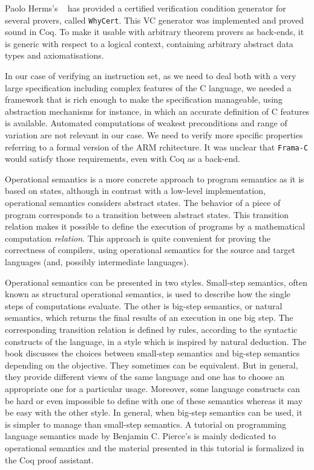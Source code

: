 \documentclass[twocolumn]{article}
\newcommand{\whyCert}{\texttt{WhyCert}\xspace}
\newcommand{\framac}{\texttt{Frama-C}\xspace}
\begin{document}
Paolo Herms's \cite{herms13phd}~\cite{herms2012certified} has provided
a certified verification condition generator for several provers,
called \whyCert.  This VC generator was implemented and proved sound
in Coq.  To make it usable with arbitrary theorem provers as
back-ends, it is generic with respect to a logical context, containing
arbitrary abstract data types and axiomatisations.

In our case of verifying an instruction set, as we need to deal both
with a very large specification including complex features of the C
language, we needed a framework that is rich enough to make the
specification manageable, using abstraction mechanisms for instance,
in which an accurate definition of C features is available.
Automated computations of weakest preconditions
and range of variation are not relevant in our case.
We need to verify more specific properties referring
to a formal version of the ARM rchitecture.
It was unclear that \framac would satisfy those requirements,
even with Coq as a back-end.

Operational semantics is a more concrete approach to program semantics
as it is based on states, although in contrast with a low-level
implementation, operational semantics considers abstract states.  The
behavior of a piece of program corresponds to a transition between
abstract states.  This transition relation makes it possible to define
the execution of programs by a mathematical computation \emph{relation}.
This approach is quite convenient for proving the
correctness of compilers, using operational semantics for the source
and target languages (and, possibly intermediate languages).

Operational semantics can be presented in two styles.  Small-step
semantics, often known as structural operational semantics, is used to
describe how the single steps of computations evaluate.  The other is
big-step semantics, or natural semantics, which returns the final
results of an execution in one big step.  The corresponding transition
relation is defined by rules, according to the syntactic constructs of
the language, in a style which is inspired by natural deduction. The
book \cite{nielson1992semantics} discusses the choices between
small-step semantics and big-step semantics depending on the
objective.  They sometimes can be equivalent.  But in general, they
provide different views of the same language and one has to choose an
appropriate one for a particular usage.  Moreover, some language
constructs can be hard or even impossible to define with one of these
semantics whereas it may be easy with the other style.  In general,
when big-step semantics can be used, it is simpler to manage than
small-step semantics. A tutorial on programming language semantics
made by Benjamin C. Pierce's \cite{pierce-tut} is mainly dedicated to
operational semantics and the material presented in this tutorial is
formalized in the Coq proof assistant.
\end{document}
